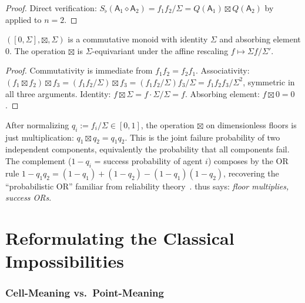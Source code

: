 \documentclass[11pt,twocolumn,a4paper]{article}
\newcommand{\agent}{\mathsf{A}}
\newcommand{\Sfloor}{S_{\flat}}
\newcommand{\Compose}{\diamond}
\begin{document}
\begin{proof}
Direct verification: $\Sfloor(\agent_1\Compose\agent_2)=
f_1f_2/\Sigma=Q(\agent_1)\boxtimes Q(\agent_2)$ by 
applied to $n=2$.
\end{proof}

\begin{proposition}
\label{prop:boxtimes}
$([0,\Sigma],\boxtimes,\Sigma)$ is a commutative monoid with identity
$\Sigma$ and absorbing element $0$. The operation $\boxtimes$ is
$\Sigma$-equivariant under the affine rescaling
$f\mapsto\Sigma f/\Sigma'$.
\end{proposition}

\begin{proof}
Commutativity is immediate from $f_1f_2=f_2f_1$. Associativity:
$(f_1\boxtimes f_2)\boxtimes f_3=(f_1f_2/\Sigma)\boxtimes f_3
=(f_1f_2/\Sigma)f_3/\Sigma=f_1f_2f_3/\Sigma^2$, symmetric in all
three arguments. Identity: $f\boxtimes\Sigma=f\cdot\Sigma/\Sigma=f$.
Absorbing element: $f\boxtimes 0=0$.
\end{proof}

\begin{remark}
\label{rem:or}
After normalizing $q_i:=f_i/\Sigma\in[0,1]$, the operation
$\boxtimes$ on dimensionless floors is just multiplication:
$q_1\boxtimes q_2=q_1q_2$. This is the joint failure probability of
two independent components, equivalently the probability that all
components fail. The complement ($1-q_i$ = success probability of
agent $i$) composes by the OR rule
$1-q_1q_2=(1-q_1)+(1-q_2)-(1-q_1)(1-q_2)$, recovering the
``probabilistic OR'' familiar from reliability
theory~\cite{lewis1969,vonneumannmorgenstern1944}.
 thus says: \emph{floor multiplies, success ORs}.
\end{remark}

\part{Reformulating the Classical Impossibilities}

\section{Cell-Meaning vs.\ Point-Meaning}
\label{sec:cell-meaning}
\end{document}
